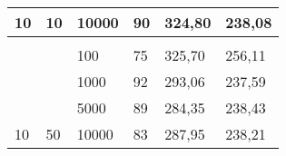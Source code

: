 \documentclass{article}
\begin{document}
\begin{table}[h]
\begin{tabular}{llllll}
			\multicolumn{1}{|l|}{\multirow{-4}{*}{10}}                             & \multicolumn{1}{l|}{\multirow{-4}{*}{10}}                             & \multicolumn{1}{l|}{10000}                                                & \multicolumn{1}{l|}{90}                                                      & \multicolumn{1}{l|}{324,80}                                                         & \multicolumn{1}{l|}{238,08}                                                           \\ \hline
			&                                                                       &                                                                           &                                                                              &                                                                                     &                                                                                       \\ \hline
			\multicolumn{1}{|l|}{}                                                 & \multicolumn{1}{l|}{}                                                 & \multicolumn{1}{l|}{100}                                                  & \multicolumn{1}{l|}{75}                                                      & \multicolumn{1}{l|}{325,70}                                                         & \multicolumn{1}{l|}{256,11}                                                           \\ \cline{3-6} 
			\multicolumn{1}{|l|}{}                                                 & \multicolumn{1}{l|}{}                                                 & \multicolumn{1}{l|}{1000}                                                 & \multicolumn{1}{l|}{92}                                                      & \multicolumn{1}{l|}{293,06}                                                         & \multicolumn{1}{l|}{237,59}                                                           \\ \cline{3-6} 
			\multicolumn{1}{|l|}{}                                                 & \multicolumn{1}{l|}{}                                                 & \multicolumn{1}{l|}{5000}                                                 & \multicolumn{1}{l|}{89}                                                      & \multicolumn{1}{l|}{284,35}                                                         & \multicolumn{1}{l|}{238,43}                                                           \\ \cline{3-6} 
			\multicolumn{1}{|l|}{\multirow{-4}{*}{10}}                             & \multicolumn{1}{l|}{\multirow{-4}{*}{50}}                             & \multicolumn{1}{l|}{10000}                                                & \multicolumn{1}{l|}{83}                                                      & \multicolumn{1}{l|}{287,95}                                                         & \multicolumn{1}{l|}{238,21}                                                           \\ \hline

\end{tabular}
\end{table}
\end{document}
